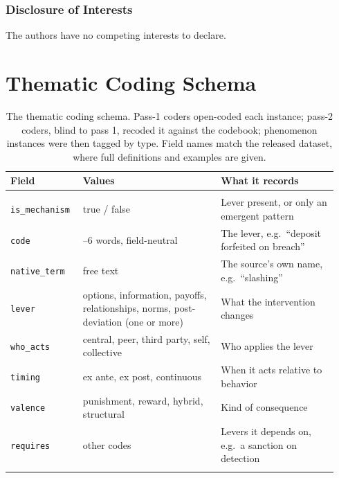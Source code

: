 \documentclass[runningheads]{llncs}
\newcommand{\rowline}{\arrayrulecolor{black!22}\specialrule{0.4pt}{2pt}{2pt}\arrayrulecolor{black}}
\begin{document}
\subsubsection*{Disclosure of Interests}
The authors have no competing interests to declare.

\appendix

\section{Thematic Coding Schema}\label{app:unified-taxonom}

\begin{table}[!tbp]
\centering
\caption{The thematic coding schema. Pass-1 coders open-coded each instance; pass-2 coders, blind to pass 1, recoded it against the codebook; phenomenon instances were then tagged by type. Field names match the released dataset, where full definitions and examples are given.}
\label{tab:coding-fields}
\scriptsize
\renewcommand{\arraystretch}{1.05}
\setlength{\tabcolsep}{4pt}
\begin{tabular}{@{}>{\raggedright\arraybackslash}p{0.20\linewidth} >{\raggedright\arraybackslash}p{0.40\linewidth} >{\raggedright\arraybackslash}p{0.34\linewidth}@{}}
\toprule
\textbf{Field} & \textbf{Values} & \textbf{What it records} \\
\midrule
\multicolumn{3}{@{}l}{\emph{Pass 1: open coding}}\\
\texttt{is\_mechanism} & true / false & Lever present, or only an emergent pattern \\ \rowline
\texttt{code} & 2--6 words, field-neutral & The lever, e.g.\ ``deposit forfeited on breach'' \\ \rowline
\texttt{native\_term} & free text & The source's own name, e.g.\ ``slashing'' \\ \rowline
\texttt{lever} & options, information, payoffs, relationships, norms, post-deviation (one or more) & What the intervention changes \\ \rowline
\texttt{who\_acts} & central, peer, third party, self, collective & Who applies the lever \\ \rowline
\texttt{timing} & ex ante, ex post, continuous & When it acts relative to behavior \\ \rowline
\texttt{valence} & punishment, reward, hybrid, structural & Kind of consequence \\ \rowline
\texttt{requires} & other codes & Levers it depends on, e.g.\ a sanction on detection \\ \rowline

\end{tabular}
\end{table}
\end{document}
